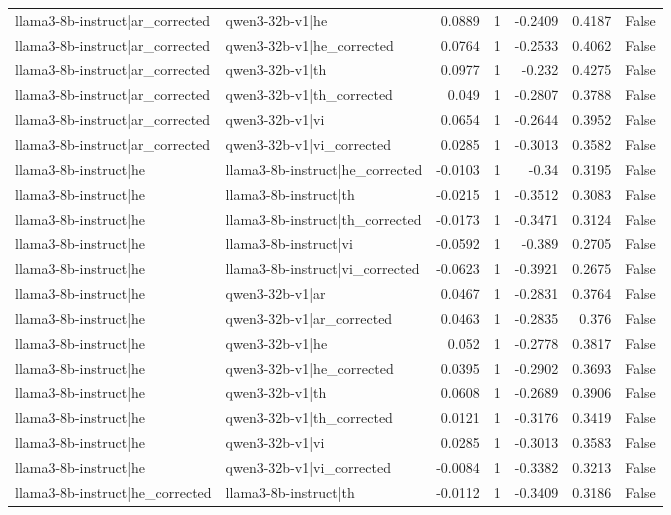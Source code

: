 \begin{table}
\begin{tabular}{l l r r r r l}
llama3-8b-instruct|ar_corrected & qwen3-32b-v1|he & 0.0889 & 1 & -0.2409 & 0.4187 & False \\
llama3-8b-instruct|ar_corrected & qwen3-32b-v1|he_corrected & 0.0764 & 1 & -0.2533 & 0.4062 & False \\
llama3-8b-instruct|ar_corrected & qwen3-32b-v1|th & 0.0977 & 1 & -0.232 & 0.4275 & False \\
llama3-8b-instruct|ar_corrected & qwen3-32b-v1|th_corrected & 0.049 & 1 & -0.2807 & 0.3788 & False \\
llama3-8b-instruct|ar_corrected & qwen3-32b-v1|vi & 0.0654 & 1 & -0.2644 & 0.3952 & False \\
llama3-8b-instruct|ar_corrected & qwen3-32b-v1|vi_corrected & 0.0285 & 1 & -0.3013 & 0.3582 & False \\
llama3-8b-instruct|he & llama3-8b-instruct|he_corrected & -0.0103 & 1 & -0.34 & 0.3195 & False \\
llama3-8b-instruct|he & llama3-8b-instruct|th & -0.0215 & 1 & -0.3512 & 0.3083 & False \\
llama3-8b-instruct|he & llama3-8b-instruct|th_corrected & -0.0173 & 1 & -0.3471 & 0.3124 & False \\
llama3-8b-instruct|he & llama3-8b-instruct|vi & -0.0592 & 1 & -0.389 & 0.2705 & False \\
llama3-8b-instruct|he & llama3-8b-instruct|vi_corrected & -0.0623 & 1 & -0.3921 & 0.2675 & False \\
llama3-8b-instruct|he & qwen3-32b-v1|ar & 0.0467 & 1 & -0.2831 & 0.3764 & False \\
llama3-8b-instruct|he & qwen3-32b-v1|ar_corrected & 0.0463 & 1 & -0.2835 & 0.376 & False \\
llama3-8b-instruct|he & qwen3-32b-v1|he & 0.052 & 1 & -0.2778 & 0.3817 & False \\
llama3-8b-instruct|he & qwen3-32b-v1|he_corrected & 0.0395 & 1 & -0.2902 & 0.3693 & False \\
llama3-8b-instruct|he & qwen3-32b-v1|th & 0.0608 & 1 & -0.2689 & 0.3906 & False \\
llama3-8b-instruct|he & qwen3-32b-v1|th_corrected & 0.0121 & 1 & -0.3176 & 0.3419 & False \\
llama3-8b-instruct|he & qwen3-32b-v1|vi & 0.0285 & 1 & -0.3013 & 0.3583 & False \\
llama3-8b-instruct|he & qwen3-32b-v1|vi_corrected & -0.0084 & 1 & -0.3382 & 0.3213 & False \\
llama3-8b-instruct|he_corrected & llama3-8b-instruct|th & -0.0112 & 1 & -0.3409 & 0.3186 & False \\

\end{tabular}
\end{table}
